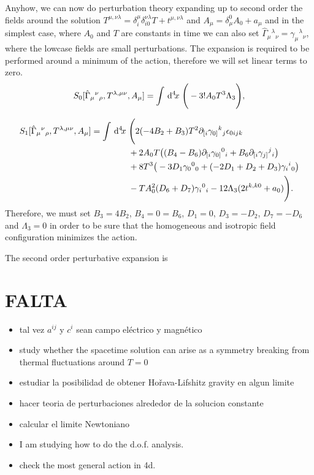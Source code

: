 \documentclass[twocolumn,
  showpacs,showkeys,prd,superscriptaddress]{revtex4-1}
\begin{document}
Anyhow, we can now do perturbation theory expanding up to second order the fields around the solution $T^{\mu,\nu\lambda} = \delta^{\mu}_i \delta_{i0}^{\nu\lambda}T + t^{\mu,\nu\lambda}$ and $A_\mu=\delta_\mu^0A_0+a_\mu$ and in the simplest case, where $A_0$ and $T$ are constants in time we can also set $\hat{\Gamma}_\mu{}^\lambda{}_\nu=\gamma_\mu{}^\lambda{}_\nu$, where the lowcase fields are small perturbations. The expansion is required to be performed around a minimum of the action, therefore we will set linear terms to zero. 
\begin{equation}
  \label{3+1fullPerturbed}
   S_0[\hat{\Gamma}_{\mu}{}^{\nu}{}_\rho,T^{\lambda,\mu\nu},A_\mu]=\int\,{\mathrm{d}}^{4}\!{x}\;\Bigg(-3!A_0T^3\Lambda_3\Bigg),
\end{equation}

\begin{equation}
  \begin{split}
    \label{3+1full1stOrder}
    S_1[\hat{\Gamma}_{\mu}{}^{\nu}{}_\rho,T^{\lambda,\mu\nu},A_\mu] = \int\,{\mathrm{d}}^{4}\!{x}\; &\Bigg(2(-4B_2+B_3)T^2\partial_{[i}\gamma_{0]}{}^k{}_j\epsilon_{0ijk} \\
    & + 2 A_0 T \big((B_4-B_6)\partial_{[i}\gamma_{0]}{}^0{}_i+B_6\partial_{[i}\gamma_{j]}{}^j{}_i\big)\\
    & + 8 T^3 \big(-3D_1\gamma_0{}^0{}_0+(-2D_1+D_2+D_3)\gamma_i{}^i{}_0\big)\\
    & - T A_0^2(D_6+D_7)\gamma_i{}^0{}_i -12\Lambda_3( 2t^{k,k0}+a_0)\Bigg).
  \end{split}
\end{equation}
Therefore, we must set $B_3=4B_2$, $B_4=0=B_6$, $D_1=0$, $D_3=-D_2$,  $D_7=-D_6$ and $\Lambda_3=0$ in order to be sure that the homogeneous and isotropic field configuration minimizes the action. 

The second order perturbative expansion  is

\section*{FALTA}

\begin{itemize}
\item tal vez $a^{ij}$ y $c^i$ sean campo el\'ectrico y magn\'etico

\item study  whether the spacetime solution can arise as a symmetry breaking from thermal fluctuations around $T=0$

\item estudiar la posibilidad de obtener Ho\v{r}ava-Lifshitz gravity en algun limite

\item hacer teoria de perturbaciones alrededor de la solucion constante

\item calcular el limite Newtoniano

\item I am studying how to do the d.o.f. analysis.
\item check the most general action in 4d.
\end{itemize}

\nocite{Tucker:1996sx,Horava:2009uw,Lu:2009em,Gibbs:1995gj,WheelerPre,Peeters:2007wn,peeters2007symbolic,Peeters2007550,sage}



\end{document}
